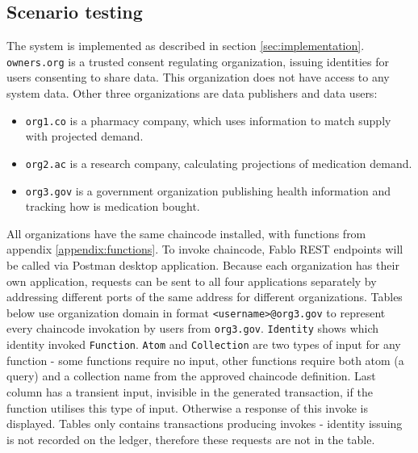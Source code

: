 \documentclass[12pt]{article}
\begin{document}
    \subsection{Scenario testing}
    \label{sec:scenario}
    The system is implemented as described in section \ref{sec:implementation}. \lstinline{owners.org} is a trusted consent regulating organization, issuing identities for users consenting to share data. This organization does not have access to any system data. Other three organizations are data publishers and data users:

    \begin{itemize}
        \item \lstinline{org1.co} is a pharmacy company, which uses information to match supply with projected demand.
        \item \lstinline{org2.ac} is a research company, calculating projections of medication demand.
        \item \lstinline{org3.gov} is a government organization publishing health information and tracking how is medication bought.
    \end{itemize}

    All organizations have the same chaincode installed, with functions from appendix \ref{appendix:functions}. To invoke chaincode, Fablo REST endpoints will be called via Postman desktop application. Because each organization has their own application, requests can be sent to all four applications separately by addressing different ports of the same address for different organizations. Tables below use organization domain in format \lstinline{<username>@org3.gov} to represent every chaincode invokation by users from \lstinline{org3.gov}. \lstinline{Identity} shows which identity invoked \lstinline{Function}. \lstinline{Atom} and \lstinline{Collection} are two types of input for any function - some functions require no input, other functions require both atom (a query) and a collection name from the approved chaincode definition. Last column has a transient input, invisible in the generated transaction, if the function utilises this type of input. Otherwise a response of this invoke is displayed. Tables only contains transactions producing invokes - identity issuing is not recorded on the ledger, therefore these requests are not in the table.
    
\end{document}
